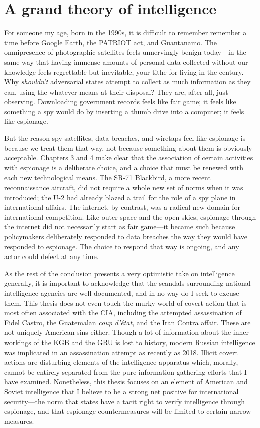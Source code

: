 \documentclass{report}
\begin{document}
\section{A grand theory of intelligence}
For someone my age, born in the 1990s, it is difficult to remember remember a time before Google Earth, the PATRIOT act, and Guantanamo. The omnipresence of photographic satellites feels unnervingly benign today---in the same way that having immense amounts of personal data collected without our knowledge feels regrettable but inevitable, your tithe for living in the  century. Why \emph{shouldn't} adversarial states attempt to collect as much information as they can, using the whatever means at their disposal? They are, after all, just observing. Downloading government records feels like fair game; it feels like something a spy would do by inserting a thumb drive into a computer; it feels like espionage.

But the reason spy satellites, data breaches, and wiretaps feel like espionage is because we treat them that way, not because something about them is obviously acceptable. Chapters 3 and 4 make clear that the association of certain activities with espionage is a deliberate choice, and a choice that must be renewed with each new technological means. The SR-71 Blackbird, a more recent reconnaissance aircraft, did not require a whole new set of norms when it was introduced; the U-2 had already blazed a trail for the role of a spy plane in international affairs. The internet, by contrast, was a radical new domain for international competition. Like outer space and the open skies, espionage through the internet did not necessarily start as fair game---it became such because policymakers deliberately responded to data breaches the way they would have responded to espionage. The choice to respond that way is ongoing, and any actor could defect at any time.


As the rest of the conclusion presents a very optimistic take on intelligence generally, it is important to acknowledge that the scandals surrounding national intelligence agencies are well-documented, and in no way do I seek to excuse them. This thesis does not even touch the murky world of covert action that is most often associated with the CIA, including the attempted assassination of Fidel Castro, the Guatemalan \emph{coup d'\'etat}, and the Iran Contra affair. These are not uniquely American sins either. Though a lot of information about the inner workings of the KGB and the GRU is lost to history, modern Russian intelligence was implicated in an assassination attempt as recently as 2018. Illicit covert actions are disturbing elements of the intelligence apparatus which, morally, cannot be entirely separated from the pure information-gathering efforts that I have examined. Nonetheless, this thesis focuses on an element of American and Soviet intelligence that I believe to be a strong net positive for international security---the norm that states have a tacit right to verify intelligence through espionage, and that espionage countermeasures will be limited to certain narrow measures.
\end{document}
